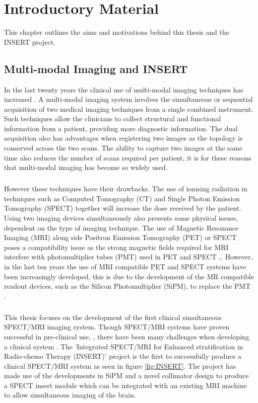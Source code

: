 \chapter{Introductory Material}
\label{chapterlabel1}

This chapter outlines the aims and motivations behind this thesis and the INSERT project.
\section{Multi-modal Imaging and INSERT}
In the last twenty years the clinical use of multi-modal imaging techniques has increased \cite{PATTON2009247}. A multi-modal imaging system involves the simultaneous or sequential acquisition of two medical imaging techniques from a single combined instrument. Such techniques allow the clinicians to collect structural and functional information from a patient, providing more diagnostic information. The dual acquisition also has advantages when registering two images as the topology is conserved across the two scans. The ability to capture two images at the same time also reduces the number of scans required per patient, it is for these reasons that multi-modal imaging has become so widely used.
\paragraph{}
However these techniques have their drawbacks. The use of ionising radiation in techniques such as Computed Tomography (CT) and Single Photon Emission Tomography (SPECT) together will increase the dose received by the patient. Using two imaging devices simultaneously also presents some physical issues, dependent on the type of imaging technique. The use of Magnetic Resonance Imaging (MRI) along side Positron Emission Tomography (PET) or SPECT poses a compatibility issue as the strong magnetic fields required for MRI interfere with photomultiplier tubes (PMT) used in PET and SPECT ,\cite{PICHLER2008199}. However, in the last ten years the use of MRI compatible PET and SPECT systems have been increasingly developed, this is due to the development of the MR compatible readout devices, such as the Silicon Photomultiplier (SiPM), to replace the PMT \cite{MCELROY2007106}. 
\paragraph{}
This thesis focuses on the development of the first clinical simultaneous SPECT/MRI imaging system. Though SPECT/MRI systems have proven successful in pre-clinical use, \cite{0031-9155-55-6-002}, there have been many challenges when developing a clinical system \cite{doi:10.1259/bjr.20160690}. The `Integrated SPECT/MRI for Enhanced stratification in Radio-chemo Therapy (INSERT)' project is the first to successfully produce a clinical SPECT/MRI system as seen in figure \ref{fig:INSERT}. The project has made use of the developments in SiPM and a novel collimator design \cite{7430864} to produce a SPECT insert module which can be integrated with an existing MRI machine to allow simultaneous imaging of the brain. 

